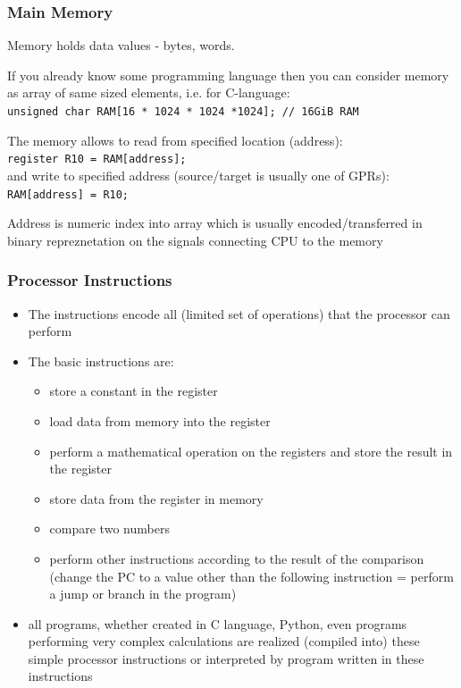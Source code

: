 \documentclass{beamer}
\begin{document}
\begin{frame}
\frametitle{Main Memory}

Memory holds data values - bytes, words.

If you already know some programming language then you can consider memory as array of same sized elements, i.e. for C-language:\\
\texttt{unsigned char RAM[16 * 1024 * 1024 *1024]; // 16GiB RAM}

\bigskip
The memory allows to read from specified location (address):\\
\texttt{register R10 = RAM[address];}\\
and write to specified address (source/target is usually one of GPRs):\\
\texttt{RAM[address] = R10;}
\bigskip

Address is numeric index into array which is usually encoded/transferred in binary repreznetation on the signals connecting CPU to the memory

\end{frame}

\begin{frame}
\frametitle{Processor Instructions}

\begin{itemize}
\item The instructions encode all (limited set of operations) that the processor can perform
\item The basic instructions are:
\begin{itemize}
\item store a constant in the register
\item load data from memory into the register
\item perform a mathematical operation on the registers and store the result in the register
\item store data from the register in memory
\item compare two numbers
\item perform other instructions according to the result of the comparison (change the PC to a value other than the following instruction = perform a jump or branch in the program)
\end{itemize}
\item all programs, whether created in C language, Python, even programs performing very complex calculations are realized (compiled into) these simple processor instructions or interpreted by program written in these instructions
\end{itemize}

\end{frame}
\end{document}
